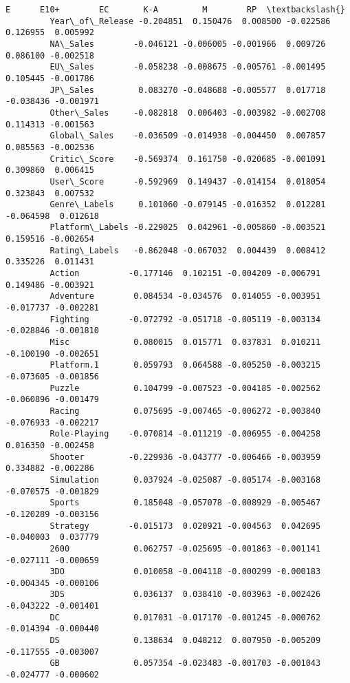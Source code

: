 \documentclass[11pt]{article}
\begin{document}
\begin{Verbatim}[commandchars=\\\{\}]
                                 E      E10+        EC       K-A         M        RP  \textbackslash{}
         Year\_of\_Release -0.204851  0.150476  0.008500 -0.022586  0.126955  0.005992   
         NA\_Sales        -0.046121 -0.006005 -0.001966  0.009726  0.086100 -0.002518   
         EU\_Sales        -0.058238 -0.008675 -0.005761 -0.001495  0.105445 -0.001786   
         JP\_Sales         0.083270 -0.048688 -0.005577  0.017718 -0.038436 -0.001971   
         Other\_Sales     -0.082818  0.006403 -0.003982 -0.002708  0.114313 -0.001563   
         Global\_Sales    -0.036509 -0.014938 -0.004450  0.007857  0.085563 -0.002536   
         Critic\_Score    -0.569374  0.161750 -0.020685 -0.001091  0.309860  0.006415   
         User\_Score      -0.592969  0.149437 -0.014154  0.018054  0.323843  0.007532   
         Genre\_Labels     0.101060 -0.079145 -0.016352  0.012281 -0.064598  0.012618   
         Platform\_Labels -0.229025  0.042961 -0.005860 -0.003521  0.159516 -0.002654   
         Rating\_Labels   -0.862048 -0.067032  0.004439  0.008412  0.335226  0.011431   
         Action          -0.177146  0.102151 -0.004209 -0.006791  0.149486 -0.003921   
         Adventure        0.084534 -0.034576  0.014055 -0.003951 -0.017737 -0.002281   
         Fighting        -0.072792 -0.051718 -0.005119 -0.003134 -0.028846 -0.001810   
         Misc             0.080015  0.015771  0.037831  0.010211 -0.100190 -0.002651   
         Platform.1       0.059793  0.064588 -0.005250 -0.003215 -0.073605 -0.001856   
         Puzzle           0.104799 -0.007523 -0.004185 -0.002562 -0.060896 -0.001479   
         Racing           0.075695 -0.007465 -0.006272 -0.003840 -0.076933 -0.002217   
         Role-Playing    -0.070814 -0.011219 -0.006955 -0.004258  0.016350 -0.002458   
         Shooter         -0.229936 -0.043777 -0.006466 -0.003959  0.334882 -0.002286   
         Simulation       0.037924 -0.025087 -0.005174 -0.003168 -0.070575 -0.001829   
         Sports           0.185048 -0.057078 -0.008929 -0.005467 -0.120289 -0.003156   
         Strategy        -0.015173  0.020921 -0.004563  0.042695 -0.040003  0.037779   
         2600             0.062757 -0.025695 -0.001863 -0.001141 -0.027111 -0.000659   
         3DO              0.010058 -0.004118 -0.000299 -0.000183 -0.004345 -0.000106   
         3DS              0.036137  0.038410 -0.003963 -0.002426 -0.043222 -0.001401   
         DC               0.017031 -0.017170 -0.001245 -0.000762 -0.014394 -0.000440   
         DS               0.138634  0.048212  0.007950 -0.005209 -0.117555 -0.003007   
         GB               0.057354 -0.023483 -0.001703 -0.001043 -0.024777 -0.000602   

\end{Verbatim}
\end{document}
